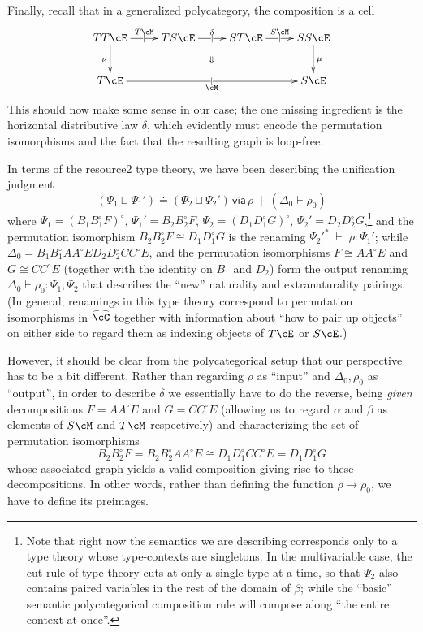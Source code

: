\documentclass{amsart}
\newcommand{\C}{\cC}
\renewcommand{\Chat}{\ensuremath{\widehat{\C}}\xspace}
\newcommand{\E}{\cE}
\newcommand{\Tmult}{\nu}
\newcommand{\Smult}{\mu}
\renewcommand{\o}{^{\circ}}
\def\types{\;\vdash\;} %
\def\cb{\;\mid\;} %
\newcommand\combine{,}
\newcommand\combineU{\sqcup}
\def\flip#1{#1^*} %
\newcommand{\unif}[4]{#1\doteq #2\,\mathsf{ via }\,#3\cb #4}
\begin{document}
Finally, recall that in a generalized polycategory, the composition is a cell
\[ \xymatrix{ TT\E \ar[r]|{|}^{T \cM} \ar[d]_{\Tmult} \ar@{}[drrr]|{\Downarrow} &
  T S \E \ar[r]|{|}^{\delta} & S T \E \ar[r]|{|}^{S \cM} & S S \E \ar[d]^{\Smult}\\
  T \E \ar[rrr]|{|}_\cM &&& S \E}\]
This should now make some sense in our case; the one missing ingredient is the horizontal distributive law $\delta$, which evidently must encode the permutation isomorphisms and the fact that the resulting graph is loop-free.

In terms of the resource2 type theory, we have been describing the unification judgment
\[
\unif{(\Psi_1 \combineU \Psi_1')} {(\Psi_2 \combineU \Psi_2')} {\rho} {(\Delta_0 \vdash \rho_0)}
\]
where $\Psi_1 = (B_1 B_1\o F)\o$, $\Psi_1' = B_2 B_2\o F$, $\Psi_2 = (D_1 D_1\o G)\o$, $\Psi_2' = D_2 D_2\o G$,\footnote{Note that right now the semantics we are describing corresponds only to a type theory whose type-contexts are singletons.  In the multivariable case, the cut rule of type theory cuts at only a single type at a time, so that $\Psi_2$ also contains paired variables in the rest of the domain of $\beta$; while the ``basic'' semantic polycategorical composition rule will compose along ``the entire context at once''.} and the permutation isomorphism $B_2 B_2\o F \cong D_1 D_1\o G$ is the renaming $\flip{\Psi_2'} \types \rho : \Psi_1'$; while $\Delta_0 = B_1 B_1\o A A\o E D_2 D_2\o C C\o E$, and the permutation isomorphisms $F \cong A A\o E$ and $G \cong C C\o E$ (together with the identity on $B_1$ and $D_2$) form the output renaming $\Delta_0 \vdash \rho_0 : \Psi_1 \combine \Psi_2$ that describes the ``new'' naturality and extranaturality pairings.
(In general, renamings in this type theory correspond to permutation isomorphisms in \Chat together with information about ``how to pair up objects'' on either side to regard them as indexing objects of $T\E$ or $S\E$.)

However, it should be clear from the polycategorical setup that our perspective has to be a bit different.
Rather than regarding $\rho$ as ``input'' and $\Delta_0,\rho_0$ as ``output'', in order to describe $\delta$ we essentially have to do the reverse, being \emph{given} decompositions $F = A A\o E$ and $G = C C\o E$ (allowing us to regard $\alpha$ and $\beta$ as elements of $S\cM$ and $T\cM$ respectively) and characterizing the set of permutation isomorphisms
\[B_2 B_2\o F = B_2 B_2\o A A\o E \cong D_1 D_1\o C C\o E = D_1 D_1\o G \]
whose associated graph yields a valid composition giving rise to these decompositions.
In other words, rather than defining the function $\rho \mapsto \rho_0$, we have to define its preimages.
\end{document}
